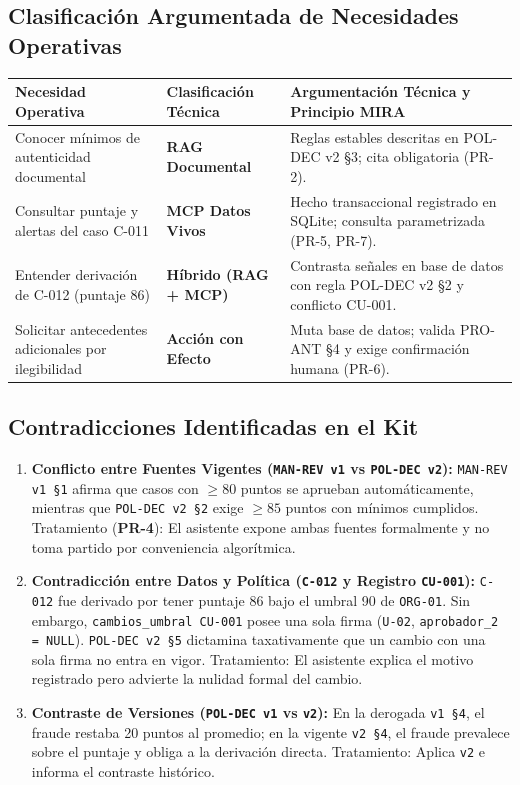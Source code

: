 \documentclass[11pt,letterpaper]{article}
\begin{document}
\subsection{Clasificación Argumentada de Necesidades Operativas}
\begin{table}[h!]
\small\centering
\begin{tabularx}{\textwidth}{lP{3.2cm}Y}
\toprule
\textbf{Necesidad Operativa} & \textbf{Clasificación Técnica} & \textbf{Argumentación Técnica y Principio MIRA} \\
\midrule
Conocer mínimos de autenticidad documental & \textbf{RAG Documental} & Reglas estables descritas en POL-DEC v2 §3; cita obligatoria (PR-2). \\
Consultar puntaje y alertas del caso C-011 & \textbf{MCP Datos Vivos} & Hecho transaccional registrado en SQLite; consulta parametrizada (PR-5, PR-7). \\
Entender derivación de C-012 (puntaje 86) & \textbf{Híbrido (RAG + MCP)} & Contrasta señales en base de datos con regla POL-DEC v2 §2 y conflicto CU-001. \\
Solicitar antecedentes adicionales por ilegibilidad & \textbf{Acción con Efecto} & Muta base de datos; valida PRO-ANT §4 y exige confirmación humana (PR-6). \\
\bottomrule
\end{tabularx}
\end{table}

\subsection{Contradicciones Identificadas en el Kit}
\begin{enumerate}
    \item \textbf{Conflicto entre Fuentes Vigentes (\texttt{MAN-REV v1} vs \texttt{POL-DEC v2}):} \texttt{MAN-REV v1 §1} afirma que casos con $\ge 80$ puntos se aprueban automáticamente, mientras que \texttt{POL-DEC v2 §2} exige $\ge 85$ puntos con mínimos cumplidos. Tratamiento (\textbf{PR-4}): El asistente expone ambas fuentes formalmente y no toma partido por conveniencia algorítmica.
    \item \textbf{Contradicción entre Datos y Política (\texttt{C-012} y Registro \texttt{CU-001}):} \texttt{C-012} fue derivado por tener puntaje 86 bajo el umbral 90 de \texttt{ORG-01}. Sin embargo, \texttt{cambios\_umbral CU-001} posee una sola firma (\texttt{U-02}, \texttt{aprobador\_2 = NULL}). \texttt{POL-DEC v2 §5} dictamina taxativamente que un cambio con una sola firma no entra en vigor. Tratamiento: El asistente explica el motivo registrado pero advierte la nulidad formal del cambio.
    \item \textbf{Contraste de Versiones (\texttt{POL-DEC v1} vs \texttt{v2}):} En la derogada \texttt{v1 §4}, el fraude restaba 20 puntos al promedio; en la vigente \texttt{v2 §4}, el fraude prevalece sobre el puntaje y obliga a la derivación directa. Tratamiento: Aplica \texttt{v2} e informa el contraste histórico.
\end{enumerate}
\end{document}
